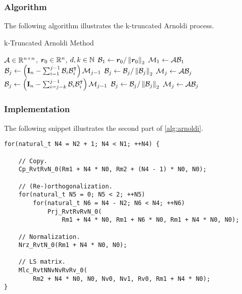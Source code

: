 \begin{frame}[fragile]
    \frametitle{Algorithm}

    The following algorithm illustrates the k-truncated Arnoldi process.

    \begin{algorithm}[H]
    \caption{k-Truncated Arnoldi Method} \label{alg:arnoldi}
    \begin{algorithmic}
    \Require $\mathcal{A} \in \mathbb{R}^{n \times n}$, $\bm{r}_0 \in \mathbb{R}^{n}$, $d, k \in \mathbb{N}$
    \State $\mathcal{B}_1 \gets \bm{r}_0 / \left\lVert \bm{r}_0 \right\rVert_2$
    \State $\mathcal{M}_1 \gets \mathcal{A} \mathcal{B}_1$
        \State $\mathcal{B}_j \gets \left( \mathbf{I}_n - \sum_{i=1}^{j-1} \mathcal{B}_i \mathcal{B}_i^{\intercal} \right) \mathcal{M}_{j-1}$
        \State $\mathcal{B}_j \gets \mathcal{B}_j / \left\lVert \mathcal{B}_j \right\rVert_2$
        \State $\mathcal{M}_j \gets \mathcal{A} \mathcal{B}_j$
    \EndFor
        \State $\mathcal{B}_j \gets \left( \mathbf{I}_n - \sum_{i=j-k}^{j-1} \mathcal{B}_i \mathcal{B}_i^{\intercal} \right) \mathcal{M}_{j-1}$
        \State $\mathcal{B}_j \gets \mathcal{B}_j / \left\lVert \mathcal{B}_j \right\rVert_2$
        \State $\mathcal{M}_j \gets \mathcal{A} \mathcal{B}_j$
    \EndFor
    \end{algorithmic}
    \end{algorithm}

\end{frame}

\begin{frame}[fragile]
    \frametitle{Implementation}

    The following snippet illustrates the second part of \cref{alg:arnoldi}.

\begin{lstlisting}[style=cpp]
for(natural_t N4 = N2 + 1; N4 < N1; ++N4) {

    // Copy.
    Cp_RvtRvN_0(Rm1 + N4 * N0, Rm2 + (N4 - 1) * N0, N0);

    // (Re-)orthogonalization.
    for(natural_t N5 = 0; N5 < 2; ++N5)
        for(natural_t N6 = N4 - N2; N6 < N4; ++N6)
            Prj_RvtRvRvN_0(
                Rm1 + N4 * N0, Rm1 + N6 * N0, Rm1 + N4 * N0, N0);

    // Normalization.
    Nrz_RvtN_0(Rm1 + N4 * N0, N0);

    // LS matrix.
    Mlc_RvtNNvNvRvRv_0(
        Rm2 + N4 * N0, N0, Nv0, Nv1, Rv0, Rm1 + N4 * N0);
}
\end{lstlisting}

\end{frame}

